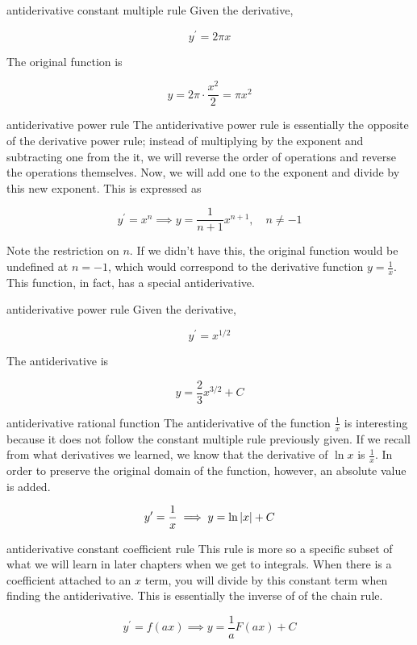 \begin{example}{antiderivative constant multiple rule}
    Given the derivative,
    
    \[ y^\prime = 2\pi x \]
    
    The original function is
    
    \[ y = 2\pi \cdot \dfrac{x^2}{2} = \pi x^2 \]
\end{example}

\begin{definition}{antiderivative power rule}
    The antiderivative power rule is essentially the opposite of the derivative power rule; instead of multiplying by the exponent and subtracting one from the it, we will reverse the order of operations and reverse the operations themselves. Now, we will add one to the exponent and divide by this new exponent. This is expressed as
    
    \[ y^\prime = x^n \implies y = \dfrac{1}{n + 1}x^{n + 1}, \quad n \ne -1 \]
    
    Note the restriction on \( n \). If we didn't have this, the original function would be undefined at \( n = -1 \), which would correspond to the derivative function \( y = \frac{1}{x} \). This function, in fact, has a special antiderivative.
\end{definition}

\begin{example}{antiderivative power rule}
    Given the derivative,
    
    \[ y^\prime = x^{1/2} \]
    
    The antiderivative is
    
    \[ y = \dfrac{2}{3}x^{3/2} + C \]
\end{example}

\begin{definition}{antiderivative rational function}
    The antiderivative of the function \( \frac{1}{x} \) is interesting because it does not follow the constant multiple rule previously given. If we recall from what derivatives we learned, we know that the derivative of \( \ln{x} \) is \( \frac{1}{x} \). In order to preserve the original domain of the function, however, an absolute value is added.
    
    \[ y^\prime = \dfrac{1}{x} \implies y = \ln{\left\lvert {x} \right\rvert} + C \]
\end{definition}

\begin{definition}{antiderivative constant coefficient rule}
    This rule is more so a specific subset of what we will learn in later chapters when we get to integrals. When there is a coefficient attached to an \( x \) term, you will divide by this constant term when finding the antiderivative. This is essentially the inverse of of the chain rule.
    
    \[ y^\prime = f \left( ax \right) \implies y = \dfrac{1}{a} F \left( ax \right) + C \]
\end{definition}

